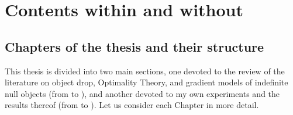 \section{Contents within and without} 

\subsection{Chapters of the thesis and their structure}
This thesis is divided into two main sections, one devoted to the review of the literature on object drop, Optimality Theory, and gradient models of indefinite null objects (from  to ), and another devoted to my own experiments and the results thereof (from  to ). Let us consider each Chapter in more detail.

